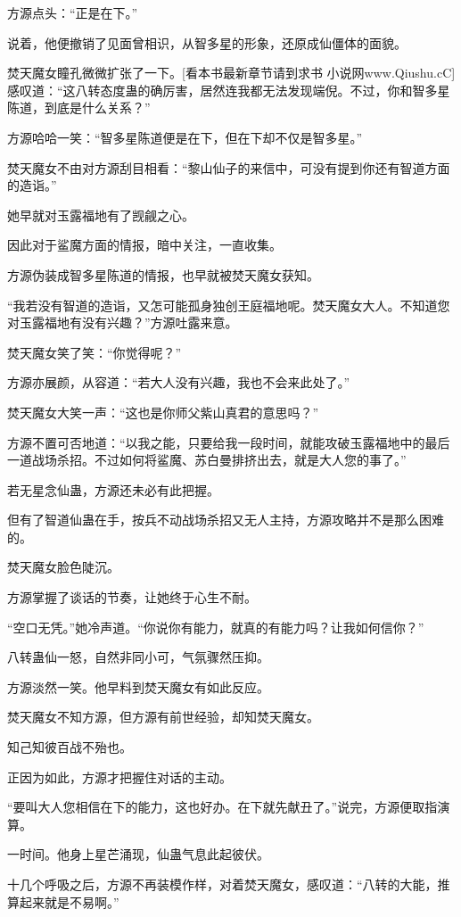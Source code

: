 \begin{this_body}
方源点头：“正是在下。”

说着，他便撤销了见面曾相识，从智多星的形象，还原成仙僵体的面貌。

焚天魔女瞳孔微微扩张了一下。[看本书最新章节请到求书 小说网www.Qiushu.cC]感叹道：“这八转态度蛊的确厉害，居然连我都无法发现端倪。不过，你和智多星陈道，到底是什么关系？”

方源哈哈一笑：“智多星陈道便是在下，但在下却不仅是智多星。”

焚天魔女不由对方源刮目相看：“黎山仙子的来信中，可没有提到你还有智道方面的造诣。”

她早就对玉露福地有了觊觎之心。

因此对于鲨魔方面的情报，暗中关注，一直收集。

方源伪装成智多星陈道的情报，也早就被焚天魔女获知。

“我若没有智道的造诣，又怎可能孤身独创王庭福地呢。焚天魔女大人。不知道您对玉露福地有没有兴趣？”方源吐露来意。

焚天魔女笑了笑：“你觉得呢？”

方源亦展颜，从容道：“若大人没有兴趣，我也不会来此处了。”

焚天魔女大笑一声：“这也是你师父紫山真君的意思吗？”

方源不置可否地道：“以我之能，只要给我一段时间，就能攻破玉露福地中的最后一道战场杀招。不过如何将鲨魔、苏白曼排挤出去，就是大人您的事了。”

若无星念仙蛊，方源还未必有此把握。

但有了智道仙蛊在手，按兵不动战场杀招又无人主持，方源攻略并不是那么困难的。

焚天魔女脸色陡沉。

方源掌握了谈话的节奏，让她终于心生不耐。

“空口无凭。”她冷声道。“你说你有能力，就真的有能力吗？让我如何信你？”

八转蛊仙一怒，自然非同小可，气氛骤然压抑。

方源淡然一笑。他早料到焚天魔女有如此反应。

焚天魔女不知方源，但方源有前世经验，却知焚天魔女。

知己知彼百战不殆也。

正因为如此，方源才把握住对话的主动。

“要叫大人您相信在下的能力，这也好办。在下就先献丑了。”说完，方源便取指演算。

一时间。他身上星芒涌现，仙蛊气息此起彼伏。

十几个呼吸之后，方源不再装模作样，对着焚天魔女，感叹道：“八转的大能，推算起来就是不易啊。”


\end{this_body}
